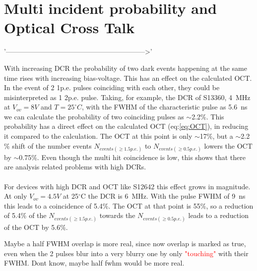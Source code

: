 \documentclass[12pt,article,type=msc,colorback,accentcolor=tud9c]{tudthesis}
\begin{document}
\section{Multi incident probability and Optical Cross Talk}
\label{appsec:multi_hit}
'------------------------------------------------------------>'

With increasing DCR the probability of two dark events happening at the same time rises with increasing bias-voltage. This has an effect on the calculated OCT. In the event of 2 1p.e. pulses coinciding with each other, they could be misinterpreted as 1 2p.e. pulse. Taking, for example, the DCR of S13360, 4~MHz at $V_{ov}=8V$ and $T=25^\circ C$, with the FWHM of the characteristic pulse as 5.6~ns we can calculate the probability of two coinciding pulses as $\sim$2.2$\%$. This probability has a direct effect on the calculated OCT (eq:\ref{eq:OCT}), in reducing it compared to the calculation. The OCT at this point is only $\sim$17$\%$, but a $\sim$2.2$\%$ shift of the number events $N_{events(\geq 1.5p.e.)}$ to $N_{events(\geq 0.5p.e.)}$ lowers the OCT by $\sim$0.75$\%$. Even though the multi hit coincidence is low, this shows that there are analysis related problems with high DCRs.\\\\

For devices with high DCR and OCT like S12642 this effect grows in magnitude. At only $V_{ov}=4.5V$ at 25$^\circ$C the DCR is 6~MHz. With the pulse FWHM of 9~ns this leads to a coincidence of 5.4$\%$. The OCT at that point is 55$\%$, so a reduction of 5.4$\%$ of the $N_{events(\geq 1.5p.e.)}$ towards the $N_{events(\geq 0.5p.e.)}$ leads to a reduction of the OCT by 5.6$\%$.

Maybe a half FWHM overlap is more real, since now overlap is marked as true, even when the 2 pulses blur into a very blurry one by only \textcolor{red}{"touching"} with their FWHM. Dont know, maybe half fwhm would be more real.




\clearpage
\newpage



\end{document}
